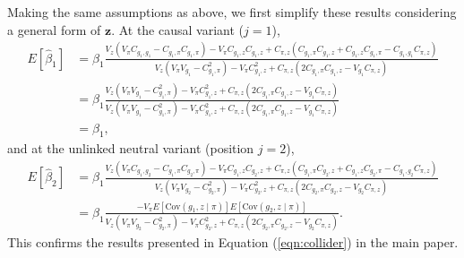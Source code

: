 \documentclass[12pt]{article}
\begin{document}
Making the same assumptions as above, we first simplify these results considering a general form of $\mathbf{z}$. 
At the causal variant ($j = 1$),
\begin{align*}
E[\hat\beta_1] & = \beta_1 \frac{V_z(V_\pi C_{g_1,g_1}-C_{g_1,\pi}C_{g_1,\pi}) 
                      - V_\pi C_{g_1,z}C_{g_1,z}
                      + C_{\pi, z}(C_{g_1,\pi}C_{g_1,z} + C_{g_1,z}C_{g_1,\pi} - C_{g_1,g_1}C_{\pi, z})}                                   {V_z(V_\pi V_{g_1}-C_{g_1,\pi}^2)
                      - V_\pi C_{g_1,z}^2 
                      + C_{\pi, z}(2C_{g_1,\pi}C_{g_1,z} - V_{g_1}C_{\pi, z})} \\
& = \beta_1 \frac{V_z(V_\pi V_{g_1}-C_{g_1,\pi}^2) 
                      - V_\pi C_{g_1,z}^2
                      + C_{\pi, z}(2C_{g_1,\pi}C_{g_1,z} - V_{g_1}C_{\pi, z})}                                   {V_z(V_\pi V_{g_1}-C_{g_1,\pi}^2)
                      - V_\pi C_{g_1,z}^2 
                      + C_{\pi, z}(2C_{g_1,\pi}C_{g_1,z} - V_{g_1}C_{\pi, z})} \\
& = \beta_1,
\end{align*}
%
and at the unlinked neutral variant (position $j = 2$),
\begin{align*}
E[\hat\beta_2] & = \beta_1 \frac{V_z(V_\pi C_{g_1,g_2}-C_{g_1,\pi}C_{g_2,\pi}) 
                      - V_\pi C_{g_1,z}C_{g_2,z}
                      + C_{\pi, z}(C_{g_1,\pi}C_{g_2,z} + C_{g_1,z}C_{g_2,\pi} - C_{g_1,g_2}C_{\pi, z})}                                   {V_z(V_\pi V_{g_2}-C_{g_2,\pi}^2)
                      - V_\pi C_{g_2,z}^2 
                      + C_{\pi, z}(2C_{g_2,\pi}C_{g_2,z} - V_{g_2}C_{\pi, z})}\\
& = \beta_1 \frac{-V_\pi
            E[\text{Cov}(g_1, z \mid \pi)]
            E[\text{Cov}(g_2, z \mid \pi)]}
                      {V_z(V_\pi V_{g_2}-C_{g_2,\pi}^2)
                      - V_\pi C_{g_2,z}^2 
                      + C_{\pi, z}(2C_{g_2,\pi}C_{g_2,z} - V_{g_2}C_{\pi, z})}.
\end{align*}
This confirms the results presented in Equation (\ref{eqn:collider}) in the main paper.
\end{document}
